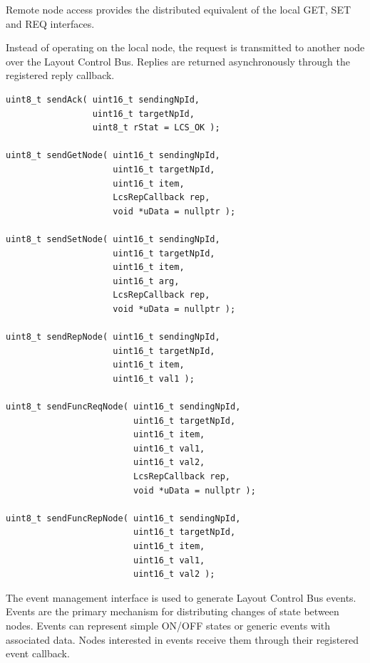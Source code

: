 
Remote node access provides the distributed equivalent of the local GET, SET and
REQ interfaces.

Instead of operating on the local node, the request is transmitted to another 
node over the Layout Control Bus. Replies are returned asynchronously through 
the registered reply callback.

\begin{lstlisting}[style=api-interface]
uint8_t sendAck( uint16_t sendingNpId,
                 uint16_t targetNpId,
                 uint8_t rStat = LCS_OK );

uint8_t sendGetNode( uint16_t sendingNpId,
                     uint16_t targetNpId,
                     uint16_t item,
                     LcsRepCallback rep,
                     void *uData = nullptr );

uint8_t sendSetNode( uint16_t sendingNpId,
                     uint16_t targetNpId,
                     uint16_t item,
                     uint16_t arg,
                     LcsRepCallback rep,
                     void *uData = nullptr );

uint8_t sendRepNode( uint16_t sendingNpId,
                     uint16_t targetNpId,
                     uint16_t item,
                     uint16_t val1 );

uint8_t sendFuncReqNode( uint16_t sendingNpId,
                         uint16_t targetNpId,
                         uint16_t item,
                         uint16_t val1,
                         uint16_t val2,
                         LcsRepCallback rep,
                         void *uData = nullptr );

uint8_t sendFuncRepNode( uint16_t sendingNpId,
                         uint16_t targetNpId,
                         uint16_t item,
                         uint16_t val1,
                         uint16_t val2 );
\end{lstlisting}


The event management interface is used to generate Layout Control Bus events. 
Events are the primary mechanism for distributing changes of state between nodes. 
Events can represent simple ON/OFF states or generic events with associated data. 
Nodes interested in events receive them through their registered event callback.

